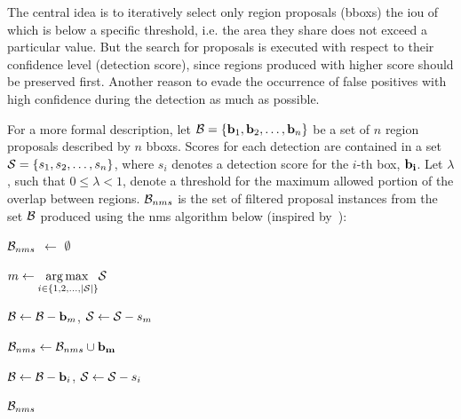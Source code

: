 The central idea is to iteratively select only region proposals (\glspl{bbox}) the \gls{iou} of which is below a specific threshold, i.e. the area they share does not exceed a particular value. But the search for proposals is executed with respect to their confidence level (detection score), since regions produced with higher score should be preserved first. Another reason to evade the occurrence of false positives with high confidence during the detection as much as possible.

For a more formal description, let $\mathcal{B} = \left\{ {\mathbf{b}_1, \mathbf{b}_2, \dots, \mathbf{b}_n} \right\}$ be a set of $n$ region proposals described by $n$ \glspl{bbox}. Scores for each detection are contained in a set $\mathcal{S} = \left\{ {s_1, s_2, \dots, s_n} \right\}$, where $s_i$ denotes a detection score for the $i$-th box, $\mathbf{b_i}$. Let $\lambda$, such that $0 \leq \lambda < 1$, denote a threshold for the maximum allowed portion of the overlap between regions. $\mathcal{B}_{nms}$ is the set of filtered proposal instances from the set $\mathcal{B}$ produced using the \gls{nms} algorithm below (inspired by~\cite{Bodla2017}):

\begin{algorithmic}[1]
    
        \State $\mathcal{B}_{nms}$ $\gets$ $\emptyset$
        
            
            \State $m \gets \underset{i \in \left\{ {1, 2, \dots, \left\vert \mathcal{S} \right\vert} \right\}}{\operatorname*{arg\,max}{}} \mathcal{S}$
            
            \State $\mathcal{B} \gets \mathcal{B} - \mathbf{b}_m$, $\mathcal{S} \gets \mathcal{S} - s_m$
            
            \State $\mathcal{B}_{nms} \gets \mathcal{B}_{nms} \cup \mathbf{b_m}$
            
            
                
                    \State $\mathcal{B} \gets \mathcal{B} - \mathbf{b}_i$, $\mathcal{S} \gets \mathcal{S} - s_i$
                \EndIf
            \EndFor
        \EndWhile
        
        \State \Return $\mathcal{B}_{nms}$
    \EndFunction
\end{algorithmic}

